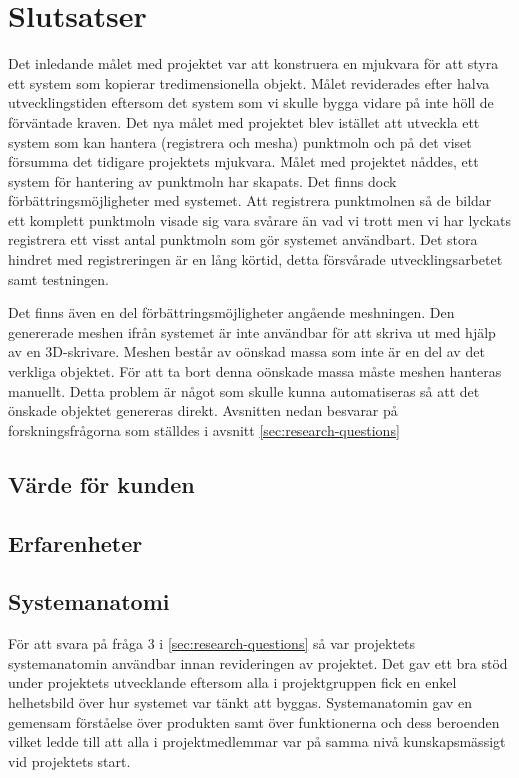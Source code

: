 \chapter{Slutsatser}
\label{cha:conclusion}
Det inledande målet med projektet var att konstruera en mjukvara för att styra ett system som kopierar tredimensionella objekt. Målet reviderades efter halva utvecklingstiden eftersom det system som vi skulle bygga vidare på inte höll de förväntade kraven. Det nya målet med projektet blev istället att utveckla ett system som kan hantera (registrera och mesha) punktmoln och på det viset försumma det tidigare projektets mjukvara. Målet med projektet nåddes, ett system för hantering av punktmoln har skapats. Det finns dock förbättringsmöjligheter med systemet. Att registrera punktmolnen så de bildar ett komplett punktmoln visade sig vara svårare än vad vi trott men vi har lyckats registrera ett visst antal punktmoln som gör systemet användbart. Det stora hindret med registreringen är en lång körtid, detta försvårade utvecklingsarbetet samt testningen. 

Det finns även en del förbättringsmöjligheter angående meshningen. Den genererade meshen ifrån systemet är inte användbar för att skriva ut med hjälp av en 3D-skrivare. Meshen består av oönskad massa som inte är en del av det verkliga objektet. För att ta bort denna oönskade massa måste meshen hanteras manuellt. Detta problem är något som skulle kunna automatiseras så att det önskade objektet genereras direkt. Avsnitten nedan besvarar på forskningsfrågorna som ställdes i avsnitt \ref{sec:research-questions}

\section{Värde för kunden}
\section{Erfarenheter}
\section{Systemanatomi}
För att svara på fråga 3 i \ref{sec:research-questions} så var projektets systemanatomin användbar innan revideringen av projektet. Det gav ett bra stöd under projektets utvecklande eftersom alla i projektgruppen fick en enkel helhetsbild över hur systemet var tänkt att byggas. Systemanatomin gav en gemensam förståelse över produkten samt över funktionerna och dess beroenden vilket ledde till att alla i projektmedlemmar var på samma nivå kunskapsmässigt vid projektets start.

